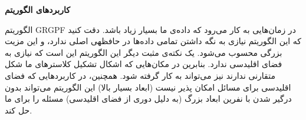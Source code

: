 \documentclass[a4paper,12pt]{article}
\begin{document}
\textbf{کاربرد‌های الگوریتم}

الگوریتم
GRGPF
در زمان‌هایی به کار می‌رود که داده‌ی ما بسیار زیاد باشد. دقت کنید که این الگوریتم نیازی به نگه داشتن 
تمامی داده‌ها در حافظهی اصلی ندارد، و این مزیت بزرگی محسوب می‌شود. یک نکته‌ی مثبت دیگر این الگوریتم این است که 
نیازی به فضای اقلیدسی ندارد. بنابرین در مکان‌هایی که اشکال تشکیل کلاستر‌های ما شکل متقارنی ندارند نیز می‌تواند به کار گرفته شود. همچنین، در کاربردهایی 
که فضای اقلیدسی برای مسائل امکان پذیر نیست (ابعاد بسیار بالا) این الگوریتم می‌تواند بدون درگیر شدن با 
نفرین ابعاد بزرگ (به دلیل دوری از فضای اقلیدسی) مسئله را برای ما حل کند. 
\end{document}
